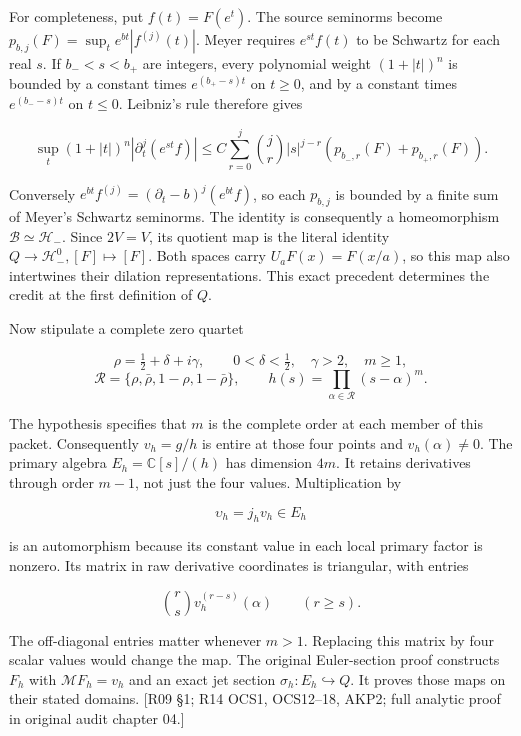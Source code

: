 For completeness, put \(f(t)=F(e^t)\). The source seminorms become \(p_{b,j}(F)=\sup_te^{bt}|f^{(j)}(t)|\). Meyer requires \(e^{st}f(t)\) to be Schwartz for each real \(s\). If \(b_-<s<b_+\) are integers, every polynomial weight \((1+|t|)^n\) is bounded by a constant times \(e^{(b_+-s)t}\) on \(t\ge0\), and by a constant times \(e^{(b_--s)t}\) on \(t\le0\). Leibniz's rule therefore gives

\[
\sup_t(1+|t|)^n|\partial_t^j(e^{st}f)|
\le C\sum_{r=0}^j\binom jr|s|^{j-r}
                  (p_{b_-,r}(F)+p_{b_+,r}(F)).
\]

Conversely \(e^{bt}f^{(j)}=(\partial_t-b)^j(e^{bt}f)\), so each \(p_{b,j}\) is bounded by a finite sum of Meyer's Schwartz seminorms. The identity is consequently a homeomorphism \(\mathscr B\simeq\mathcal H_-\). Since \(2V=V\), its quotient map is the literal identity \(Q\to\mathcal H_-^0,[F]\mapsto[F]\). Both spaces carry \(U_aF(x)=F(x/a)\), so this map also intertwines their dilation representations. This exact precedent determines the credit at the first definition of \(Q\).

Now stipulate a complete zero quartet

\[
\rho=\tfrac12+\delta+i\gamma,\qquad
0<\delta<\tfrac12,\quad\gamma>2,\quad m\ge1,
\] \[
\mathcal R=\{\rho,\bar\rho,1-\rho,1-\bar\rho\},\qquad
h(s)=\prod_{\alpha\in\mathcal R}(s-\alpha)^m.
\]

The hypothesis specifies that \(m\) is the complete order at each member of this packet. Consequently \(v_h=g/h\) is entire at those four points and \(v_h(\alpha)\ne0\). The primary algebra \(E_h=\mathbb C[s]/(h)\) has dimension \(4m\). It retains derivatives through order \(m-1\), not just the four values. Multiplication by

\[
\upsilon_h=j_hv_h\in E_h
\]

is an automorphism because its constant value in each local primary factor is nonzero. Its matrix in raw derivative coordinates is triangular, with entries

\[
\binom rs v_h^{(r-s)}(\alpha)\qquad(r\ge s).
\]

The off-diagonal entries matter whenever \(m>1\). Replacing this matrix by four scalar values would change the map. The original Euler-section proof constructs \(F_h\) with \(\mathcal MF_h=v_h\) and an exact jet section \(\sigma_h:E_h\hookrightarrow Q\). It proves those maps on their stated domains. {[}R09 §1; R14 OCS1, OCS12--18, AKP2; full analytic proof in original audit chapter 04.{]}

